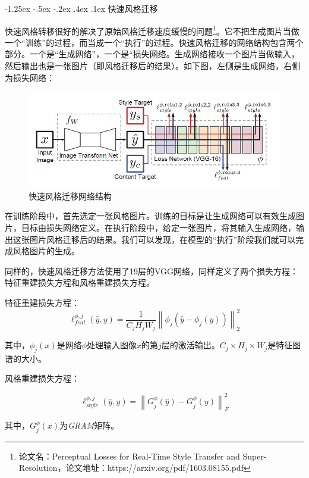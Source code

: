 \documentclass[a4paper, 11pt]{article}
\makeatletter
\newcommand{\xiaosihao}{\fontsize{12pt}{\baselineskip}\selectfont}
\renewcommand\subsection{\@startsection{subsection}{1}{\z@}%
{-1.25ex \@plus -.5ex \@minus -.2ex}%
{.4ex \@plus .1ex}%
{\normalfont\xiaosihao\CJKfamily{hei}}}
\makeatother
\begin{document}
\subsection{快速风格迁移}
\label{subsection:快速风格迁移}

快速风格转移很好的解决了原始风格迁移速度缓慢的问题\footnote{论文名：Perceptual Losses for Real-Time Style Transfer and Super-Resolution，论文地址：https://arxiv.org/pdf/1603.08155.pdf}。它不把生成图片当做一个“训练”的过程，而当成一个“执行”的过程。快速风格迁移的网络结构包含两个部分。一个是“生成网络”，一个是“损失网络。生成网络接收一个图片当做输入，然后输出也是一张图片（即风格迁移后的结果）。如下图，左侧是生成网络，右侧为损失网络：
\begin{figure}
\centering
\includegraphics[width=5.00in,height=1.8 in]{imgs/fast_cnn_transfer.jpg}
\caption{快速风格迁移网络结构}
\end{figure}
在训练阶段中，首先选定一张风格图片。训练的目标是让生成网络可以有效生成图片，目标由损失网络定义。在执行阶段中，给定一张图片，将其输入生成网络，输出这张图片风格迁移后的结果。我们可以发现，在模型的“执行”阶段我们就可以完成风格图片的生成。

同样的，快速风格迁移方法使用了19层的VGG网络，同样定义了两个损失方程：特征重建损失方程和风格重建损失方程。

特征重建损失方程：
\begin{equation}
\ell^{\phi,j}_{feat}(\hat{y},y)=\frac{1}{C_jH_jW_j}\left \|\phi_j(\hat{y}-\phi_j(y))  \right \|^2_2
\end{equation}

其中，$\phi_j(x)$是网络$\phi$处理输入图像$x$的第$j$层的激活输出。$C_j\times H_j \times W_j$是特征图谱的大小。

风格重建损失方程：

\begin{equation}
\ell^{\phi,j}_{style}(\hat{y},y)=\left \|G^{\phi}_j(\hat{y})-G^{\phi}_j(y)  \right \|^2_F
\end{equation}

其中，$G^\phi_j(x)$为\emph{GRAM}矩阵。
\end{document}

